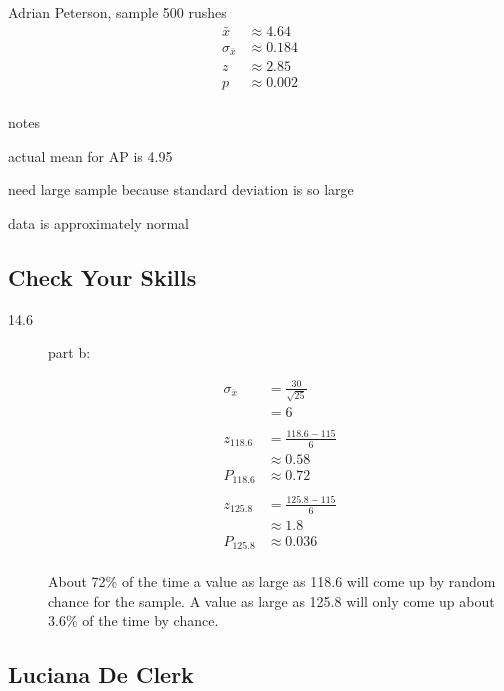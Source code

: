 \documentclass[landscape]{exam}
\begin{document}
  Adrian Peterson, sample 500 rushes
  \begin{align*}
    \bar{x}          & \approx 4.64 \\
    \sigma_{\bar{x}} & \approx 0.184 \\
    z                & \approx 2.85 \\
    p                & \approx 0.002 \\
  \end{align*}

  notes
  \begin{itemize*}
    \item actual mean for AP is 4.95
    \item need large sample because standard deviation is so large
    \item data is approximately normal
  \end{itemize*}

  \subsection{Check Your Skills}
  \begin{description}
    \item[14.6]

      part b:

      \begin{align*}
        \sigma_{\bar{x}} & = \frac{30}{\sqrt{25}} \\
                         & = 6 \\
        \\
        z_{118.6}        & = \frac{118.6 - 115}{6} \\
                         & \approx 0.58 \\
        P_{118.6}        & \approx 0.72 \\
        \\
        z_{125.8}        & = \frac{125.8 - 115}{6} \\
                         & \approx 1.8 \\
        P_{125.8}        & \approx 0.036 \\
      \end{align*}

      About 72\% of the time a value as large as 118.6 will come up by random
      chance for the sample. A value as large as 125.8 will only come up about
      3.6\% of the time by chance.
  \end{description}
  \subsection{Luciana De Clerk}
\end{document}
